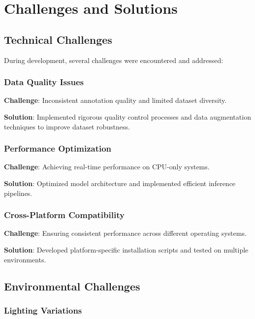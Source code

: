 \documentclass[12pt,a4paper]{article}
\begin{document}
\section{Challenges and Solutions}

\subsection{Technical Challenges}

During development, several challenges were encountered and addressed:

\subsubsection{Data Quality Issues}

\textbf{Challenge}: Inconsistent annotation quality and limited dataset diversity.

\textbf{Solution}: Implemented rigorous quality control processes and data augmentation techniques to improve dataset robustness.

\subsubsection{Performance Optimization}

\textbf{Challenge}: Achieving real-time performance on CPU-only systems.

\textbf{Solution}: Optimized model architecture and implemented efficient inference pipelines.

\subsubsection{Cross-Platform Compatibility}

\textbf{Challenge}: Ensuring consistent performance across different operating systems.

\textbf{Solution}: Developed platform-specific installation scripts and tested on multiple environments.

\subsection{Environmental Challenges}

\subsubsection{Lighting Variations}
\end{document}
